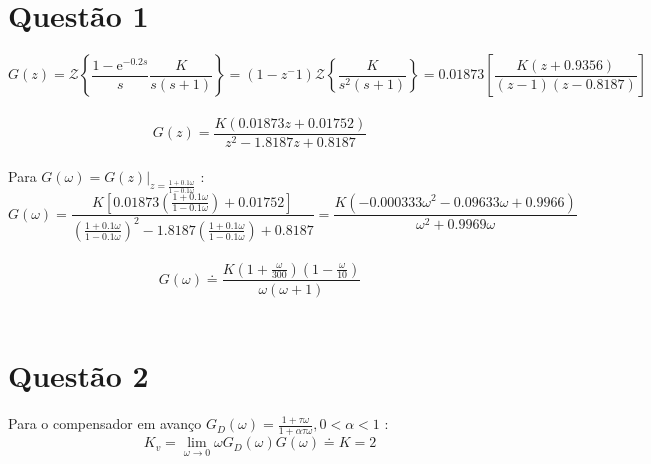 \documentclass{article}
\begin{document}
\section*{Questão 1}

    $$ G(z) = \mathcal{Z}\left\{\frac{ 1 - \mathrm{e}^{-0.2s} }{s} \frac{K}{s(s+1)} \right\} = (1-z^-1) \mathcal{Z}\left\{ \frac{K}{s^{2} (s+1)}  \right\} = 0.01873\left[ \frac{ K(z+0.9356) }{ (z-1)(z-0.8187) } \right] $$\\[0.1cm]

    $$ G(z) = \frac{ K(0.01873z + 0.01752) }{ z^{2}-1.8187z+0.8187 } $$\\[0.1cm]

    {Para $ G(\omega) = G(z) |_{z = \frac{ 1+0.1\omega }{ 1-0.1\omega }} $ :}\\[0.1cm]

    $$ G(\omega) = \frac{ K\left[0.01873\left(\frac{ 1+0.1\omega }{ 1-0.1\omega }\right) + 0.01752\right] }{ \left(\frac{ 1+0.1\omega }{ 1-0.1\omega }\right)^{2}-1.8187\left(\frac{ 1+0.1\omega }{ 1-0.1\omega }\right)+0.8187 } = \frac{ K(-0.000333\omega^{2} -0.09633\omega +0.9966) }{ \omega^{2} +0.9969\omega } $$\\[0.1cm]

    $$ G(\omega) \doteq \frac{ K\left( 1+\frac{\omega}{300} \right)\left( 1-\frac{\omega}{10} \right) }{ \omega( \omega +1 ) } $$\\[0.2cm]

\section*{Questão 2}
    {Para o compensador em avanço $ G_{D}(\omega) = \frac{ 1 + \tau\omega }{ 1 + \alpha\tau\omega }, 0<\alpha<1 $ :}\\[0.1cm]

    $$ K_{v} = \lim_{\omega \to 0} \omega G_{D}(\omega)G(\omega) \doteq K = 2 $$\\[0.2cm]
\end{document}
